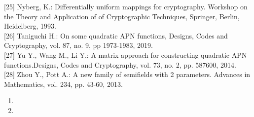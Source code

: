 \documentclass[10pt]{article}
\begin{document}
[25] Nyberg, K.: Differentially uniform mappings for cryptography. Workshop on the Theory and Application of of Cryptographic Techniques, Springer, Berlin, Heidelberg, 1993.\\[0pt]
[26] Taniguchi H.: On some quadratic APN functions, Designs, Codes and Cryptography, vol. 87, no. 9, pp 1973-1983, 2019.\\[0pt]
[27] Yu Y., Wang M., Li Y.: A matrix approach for constructing quadratic APN functions.Designs, Codes and Cryptography, vol. 73, no. 2, pp. 587600, 2014.\\[0pt]
[28] Zhou Y., Pott A.: A new family of semifields with 2 parameters. Advances in Mathematics, vol. 234, pp. 43-60, 2013.

\begin{enumerate}
  \item 
  \item 
\end{enumerate}
\end{document}
